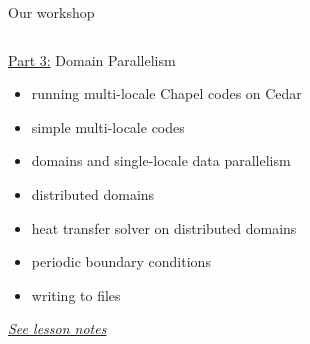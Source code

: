 \documentclass[10pt,xcolor=pdftex,dvipsnames,table]{beamer}
\newcommand{\tc}{\textcolor}
\begin{document}
\begin{frame}{Our workshop}
\begin{columns}[]
\begin{block}{}
\begin{center}
        {\sc \underline{Part 3:} Domain Parallelism}
      \end{center}
      \vspace{-2mm}
      {\let\normalsize\footnotesize \normalsize
        \begin{itemize}\setlength{\itemsep}{1mm}
        \item running multi-locale Chapel codes on Cedar
        \item simple multi-locale codes
        \item domains and single-locale data parallelism
        \item distributed domains
        \item heat transfer solver on distributed domains
        \item periodic boundary conditions
        \item writing to files
        \end{itemize}}
      \begin{center}
        \href{http://bit.ly/2CC8MLW}{\tc{Mahogany}{\it See lesson notes}}
      \end{center}
    \end{block}
  \end{columns}
\end{frame}
\end{document}
